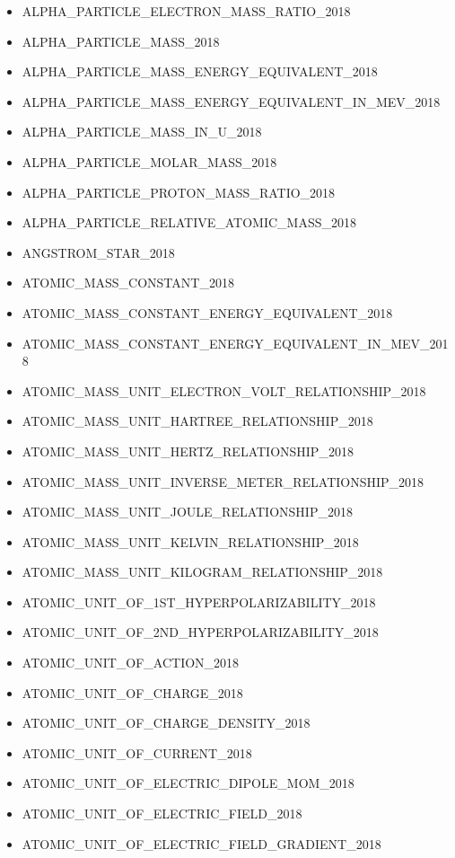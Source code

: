 \begin{itemize}
\item
  ALPHA\_PARTICLE\_ELECTRON\_MASS\_RATIO\_2018
\item
  ALPHA\_PARTICLE\_MASS\_2018
\item
  ALPHA\_PARTICLE\_MASS\_ENERGY\_EQUIVALENT\_2018
\item
  ALPHA\_PARTICLE\_MASS\_ENERGY\_EQUIVALENT\_IN\_MEV\_2018
\item
  ALPHA\_PARTICLE\_MASS\_IN\_U\_2018
\item
  ALPHA\_PARTICLE\_MOLAR\_MASS\_2018
\item
  ALPHA\_PARTICLE\_PROTON\_MASS\_RATIO\_2018
\item
  ALPHA\_PARTICLE\_RELATIVE\_ATOMIC\_MASS\_2018
\item
  ANGSTROM\_STAR\_2018
\item
  ATOMIC\_MASS\_CONSTANT\_2018
\item
  ATOMIC\_MASS\_CONSTANT\_ENERGY\_EQUIVALENT\_2018
\item
  ATOMIC\_MASS\_CONSTANT\_ENERGY\_EQUIVALENT\_IN\_MEV\_2018
\item
  ATOMIC\_MASS\_UNIT\_ELECTRON\_VOLT\_RELATIONSHIP\_2018
\item
  ATOMIC\_MASS\_UNIT\_HARTREE\_RELATIONSHIP\_2018
\item
  ATOMIC\_MASS\_UNIT\_HERTZ\_RELATIONSHIP\_2018
\item
  ATOMIC\_MASS\_UNIT\_INVERSE\_METER\_RELATIONSHIP\_2018
\item
  ATOMIC\_MASS\_UNIT\_JOULE\_RELATIONSHIP\_2018
\item
  ATOMIC\_MASS\_UNIT\_KELVIN\_RELATIONSHIP\_2018
\item
  ATOMIC\_MASS\_UNIT\_KILOGRAM\_RELATIONSHIP\_2018
\item
  ATOMIC\_UNIT\_OF\_1ST\_HYPERPOLARIZABILITY\_2018
\item
  ATOMIC\_UNIT\_OF\_2ND\_HYPERPOLARIZABILITY\_2018
\item
  ATOMIC\_UNIT\_OF\_ACTION\_2018
\item
  ATOMIC\_UNIT\_OF\_CHARGE\_2018
\item
  ATOMIC\_UNIT\_OF\_CHARGE\_DENSITY\_2018
\item
  ATOMIC\_UNIT\_OF\_CURRENT\_2018
\item
  ATOMIC\_UNIT\_OF\_ELECTRIC\_DIPOLE\_MOM\_2018
\item
  ATOMIC\_UNIT\_OF\_ELECTRIC\_FIELD\_2018
\item
  ATOMIC\_UNIT\_OF\_ELECTRIC\_FIELD\_GRADIENT\_2018

\end{itemize}
